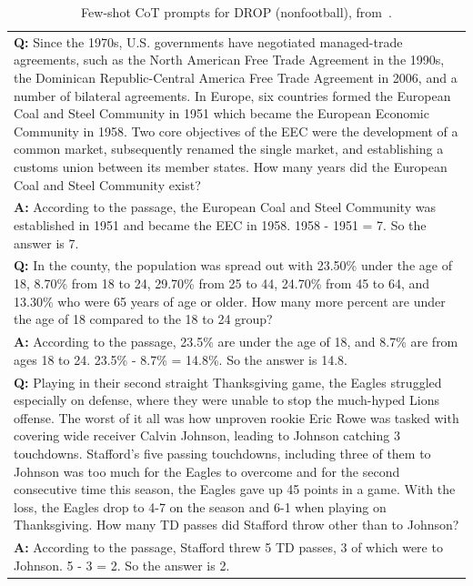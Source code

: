 \documentclass{article} %
\begin{document}
\begin{table}[h]
    \caption{
    Few-shot CoT prompts for DROP (nonfootball), from~\cite{Zhou2022LeasttoMostPE}.
    }
    \centering
    \small
    \begin{tabular}{p{13.5cm}}
        \toprule
        \textbf{Q:} Since the 1970s, U.S. governments have negotiated managed-trade agreements, such as the North American Free Trade Agreement in the 1990s, the Dominican Republic-Central America Free Trade Agreement in 2006, and a number of bilateral agreements. In Europe, six countries formed the European Coal and Steel Community in 1951 which became the European Economic Community in 1958. Two core objectives of the EEC were the development of a common market, subsequently renamed the single market, and establishing a customs union between its member states. How many years did the European Coal and Steel Community exist? \\
        \vspace{-1mm}
        \textbf{A:} According to the passage, the European Coal and Steel Community was established in 1951 and became the EEC in 1958. 1958 - 1951 = 7. So the answer is 7. \\
        \vspace{0mm}
        \textbf{Q:} In the county, the population was spread out with 23.50\% under the age of 18, 8.70\% from 18 to 24, 29.70\% from 25 to 44, 24.70\% from 45 to 64, and 13.30\% who were 65 years of age or older. How many more percent are under the age of 18 compared to the 18 to 24 group? \\
        \vspace{-1mm}
        \textbf{A:} According to the passage, 23.5\% are under the age of 18, and 8.7\% are from ages 18 to 24. 23.5\% - 8.7\% = 14.8\%. So the answer is 14.8. \\
        \vspace{0mm}
        \textbf{Q:} Playing in their second straight Thanksgiving game, the Eagles struggled especially on defense, where they were unable to stop the much-hyped Lions offense. The worst of it all was how unproven rookie Eric Rowe was tasked with covering wide receiver Calvin Johnson, leading to Johnson catching 3 touchdowns. Stafford's five passing touchdowns, including three of them to Johnson was too much for the Eagles to overcome and for the second consecutive time this season, the Eagles gave up 45 points in a game. With the loss, the Eagles drop to 4-7 on the season and 6-1 when playing on Thanksgiving. How many TD passes did Stafford throw other than to Johnson? \\
        \vspace{-1mm}
        \textbf{A:} According to the passage, Stafford threw 5 TD passes, 3 of which were to Johnson. 5 - 3 = 2. So the answer is 2. \\
        \bottomrule
    \end{tabular}
    \label{tab:prompt-dropnf}
\end{table}
\end{document}
